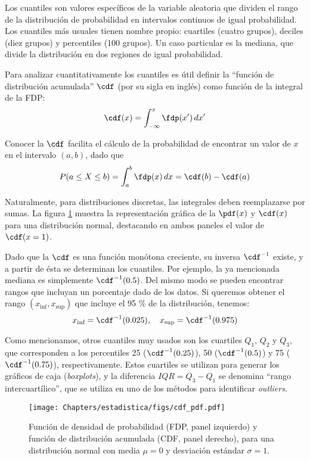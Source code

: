 Los cuantiles son valores específicos de la variable aleatoria que dividen el rango de la distribución de probabilidad en intervalos continuos de igual probabilidad. Los cuantiles más usuales tienen nombre propio: cuartiles (cuatro grupos), deciles (diez grupos) y percentiles (100 grupos). Un caso particular es la mediana, que divide la distribución en dos regiones de igual probabilidad.

Para analizar cuantitativamente los cuantiles es útil definir la ``función de distribución acumulada'' $\cdf$ (por su sigla en inglés) como función de la integral de la FDP:
\begin{equation}
 \cdf(x) = \int_{-\infty}^x \fdp(x') \, dx'
\end{equation}

Conocer la $\cdf$ facilita el cálculo de la probabilidad de encontrar un valor de $x$ en el intervalo $(a, b)$, dado que
\[ P(a \leq X \leq b) = \int_a^b \fdp(x) \, dx = \cdf(b) - \cdf(a) \]

Naturalmente, para distribuciones discretas, las integrales deben reemplazarse por sumas. La figura \ref{fig:estad02} muestra la representación gráfica de la $\pdf(x)$ y $\cdf(x)$ para una distribución normal, destacando en ambos paneles el valor de $\cdf(x = 1)$.

Dado que la $\cdf$ es una función monótona creciente, su inversa $\cdf^{-1}$ existe, y a partir de ésta se determinan los cuantiles. Por ejemplo, la ya mencionada mediana es simplemente $\cdf^{-1}(0.5)$. Del mismo modo se pueden encontrar rangos que incluyan un porcentaje dado de los datos. Si queremos obtener el rango $(x_{\text{inf}}, x_{\text{sup}})$ que incluye el 95 \% de la distribución, tenemos:
\[ x_{\text{inf}} = \cdf^{-1}(0.025), \quad x_{\text{sup}} = \cdf^{-1}(0.975) \]

Como mencionamos, otros cuantiles muy usados son los cuartiles $Q_1$, $Q_2$ y $Q_3$, que corresponden a los percentiles 25 ($\cdf^{-1}(0.25)$), 50 ($\cdf^{-1}(0.5)$) y 75 ($\cdf^{-1}(0.75)$), respectivamente. Estos cuartiles se utilizan para generar los gráficos de caja (\textit{boxplots}), y la diferencia $IQR = Q_3 - Q_1$ se denomina ``rango intercuartílico'', que se utiliza en uno de los métodos para identificar \textit{outliers}.


\begin{figure}[t]
 \centering
 \texttt{[image: Chapters/estadistica/figs/cdf\_pdf.pdf]}
 \caption{Función de densidad de probabilidad (FDP, panel izquierdo) y función de distribución acumulada (CDF, panel derecho), para una distribución normal con media $\mu = 0$ y desviación estándar $\sigma = 1$.}
 \label{fig:estad02}
\end{figure}


